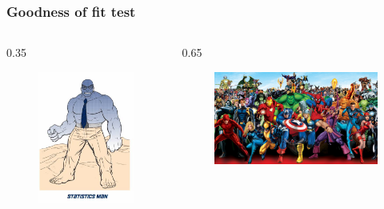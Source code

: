 \documentclass[aspectratio=169]{beamer}
\begin{document}
\begin{frame}
  \frametitle{Goodness of fit test}

  \begin{columns}
    \begin{column} {0.35\textwidth}

    \begin{figure}
      \centering
        \includegraphics[height=.5\textheight]{img/les6-man.jpg}
    \end{figure}

    \end{column}
    \begin{column} {0.65\textwidth}

    \begin{figure}
      \centering
        \includegraphics[height=.5\textheight]{img/les5-heroes.jpg}
    \end{figure}


\end{column}
\end{columns}
\end{frame}
\end{document}
